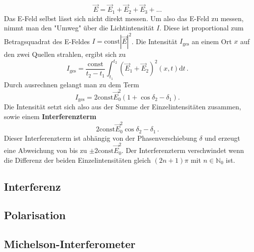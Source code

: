\begin{equation*}
    \vec{E} = \vec{E}_1 + \vec{E}_2 + \vec{E}_3 + ...
\end{equation*}
Das E-Feld selbst lässt sich nicht direkt messen.
Um also das E-Feld zu messen, nimmt man den "Umweg" über die Lichtintensität $I$.
Diese ist proportional zum Betragsquadrat des E-Feldes $I = \text{const} |\vec{E}|^2$.
Die Intensität $I_{\text{ges}}$ an einem Ort $x$ auf den zwei Quellen strahlen,
ergibt sich zu 
\begin{equation*}
    I_{\text{ges}} = \frac{\text{const}}{t_2 - t_1} \int_{t_1}^{t_2} \left( \vec{E}_1 + \vec{E}_2 \right)^2 \left(x,t\right) \text{d}t\, .
\end{equation*}
Durch ausrechnen gelangt man zu dem Term
\begin{equation*}
    I_{\text{ges}} = 2\text{const}\vec{E}_0^2\left(1 + \cos{δ_2-δ_1}\right).
\end{equation*}
Die Intensität setzt sich also aus der Summe der Einzelintensitäten zusammen,
sowie einem \textbf{Interferenzterm}
\begin{equation*}
    2\text{const}\vec{E}_0^2\cos{δ_2-δ_1}\, .
\end{equation*}
Dieser Interferenzterm ist abhängig von der Phasenverschiebung $δ$ und erzeugt eine Abweichung von bis zu $\pm 2\text{const}\vec{E}_0^2.$ 
Der Interferenzterm verschwindet wenn die Differenz der beiden Einzelintensitäten gleich $(2n + 1)π$ mit $n \in \mathbb{N}_0$ ist.

\subsection{Interferenz}
\label{sec:Interferenz}


\subsection{Polarisation}
\label{sec:Polarisation}


\subsection{Michelson-Interferometer}
\label{sec:Michelson-Interferometer}


